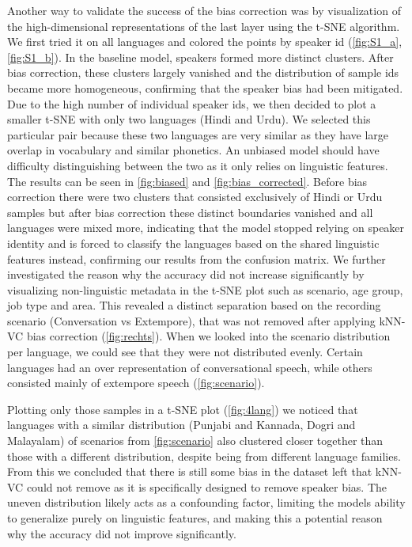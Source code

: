 \documentclass[11pt]{article}
\begin{document}
 Another way to validate the success of the bias correction was by visualization of the high-dimensional representations of the last layer using the t-SNE algorithm.  We first tried it on all languages and colored the points by speaker id (\ref{fig:S1_a}, \ref{fig:S1_b}). In the baseline model, speakers formed more distinct clusters. After bias correction, these clusters largely vanished and the distribution of sample ids became more homogeneous, confirming that the speaker bias had been mitigated. Due to the high number of individual speaker ids, we then decided to plot a smaller t-SNE with only two languages (Hindi and Urdu). We selected this particular pair because these two languages are very similar as they have large overlap in vocabulary and similar phonetics. An unbiased model should have difficulty distinguishing between the two as it only relies on linguistic features. The results can be seen in \ref{fig:biased} and \ref{fig:bias_corrected}. Before bias correction there were two clusters that consisted exclusively of Hindi or Urdu samples but after bias correction these distinct boundaries vanished and all languages were mixed more, indicating that the model stopped relying on speaker identity and is forced to classify the languages based on the shared linguistic features instead, confirming our results from the confusion matrix.
 We further investigated the reason why the accuracy did not increase significantly by visualizing non-linguistic metadata in the t-SNE plot such as scenario, age group, job type and area. This revealed a distinct separation based on the recording scenario (Conversation vs Extempore), that was not removed after applying kNN-VC bias correction (\ref{fig:rechts}). When we looked into the scenario distribution per language, we could see that they were not distributed evenly. Certain languages had an over representation of conversational speech, while others consisted mainly of extempore speech (\ref{fig:scenario}).

 Plotting only those samples in a t-SNE plot (\ref{fig:4lang}) we noticed that languages with a similar distribution (Punjabi and Kannada, Dogri and Malayalam) of scenarios from \ref{fig:scenario} also clustered closer together than those with a different distribution, despite being from different language families.
 From this we concluded that there is still some bias in the dataset left that kNN-VC could not remove as it is specifically designed to remove speaker bias. The uneven distribution likely acts as a confounding factor, limiting the models ability to generalize purely on linguistic features, and making this a potential reason why the accuracy did not improve significantly.
\end{document}
